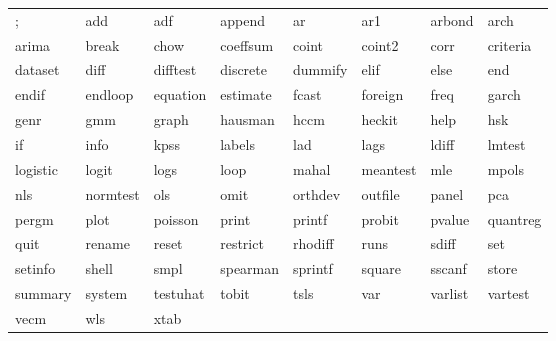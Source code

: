 \begin{tabular}{llllllll}
; & add & adf & append & ar & ar1 & arbond & arch \\
arima & break & chow & coeffsum & coint & coint2 & corr & criteria \\
dataset & diff & difftest & discrete & dummify & elif & else & end \\
endif & endloop & equation & estimate & fcast & foreign & freq & garch \\
genr & gmm & graph & hausman & hccm & heckit & help & hsk \\
if & info & kpss & labels & lad & lags & ldiff & lmtest \\
logistic & logit & logs & loop & mahal & meantest & mle & mpols \\
nls & normtest & ols & omit & orthdev & outfile & panel & pca \\
pergm & plot & poisson & print & printf & probit & pvalue & quantreg \\
quit & rename & reset & restrict & rhodiff & runs & sdiff & set \\
setinfo & shell & smpl & spearman & sprintf & square & sscanf & store \\
summary & system & testuhat & tobit & tsls & var & varlist & vartest \\
vecm & wls & xtab & \\
\end{tabular}

